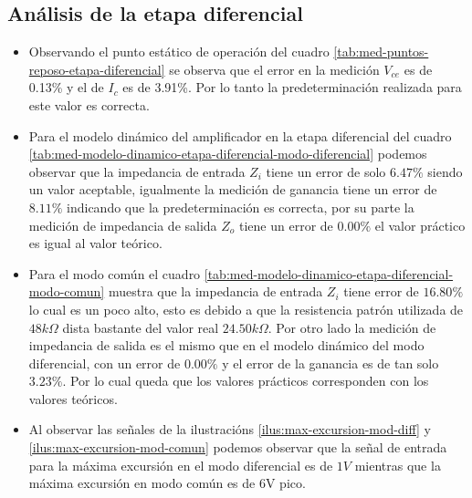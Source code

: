 \subsection{Análisis de la etapa diferencial}


\begin{itemize}
    \item Observando el punto estático de operación del cuadro \ref{tab:med-puntos-reposo-etapa-diferencial} se observa que el error en la medición $V_{ce}$ es de 0.13\% y el de $I_c$ es de 3.91\%. Por lo tanto la predeterminación realizada para este valor es correcta.
    \item Para el modelo dinámico del amplificador en la etapa diferencial del cuadro \ref{tab:med-modelo-dinamico-etapa-diferencial-modo-diferencial} podemos observar que la impedancia de entrada $Z_i$ tiene un error de solo $6.47\%$ siendo un valor aceptable, igualmente la medición de ganancia tiene un error de $8.11\%$ indicando que la predeterminación es correcta, por su parte la medición de impedancia de salida $Z_o$ tiene un error de $0.00\%$ el valor práctico es igual al valor teórico.
    \item Para el modo común el cuadro \ref{tab:med-modelo-dinamico-etapa-diferencial-modo-comun} muestra que la impedancia de entrada $Z_i$ tiene error de $16.80\%$ lo cual es un poco alto, esto es debido a que la resistencia patrón utilizada de $48k\Omega$ dista bastante del valor real $24.50k\Omega$. Por otro lado la medición de impedancia de salida es el mismo que en el modelo dinámico del modo diferencial, con un error de $0.00\%$ y el error de la ganancia es de tan solo $3.23\%$. Por lo cual queda que los valores prácticos corresponden con los valores teóricos.
    \item Al observar las señales de la ilustracións \ref{ilus:max-excursion-mod-diff} y \ref{ilus:max-excursion-mod-comun} podemos observar que la señal de entrada para la máxima excursión en el modo diferencial es de $1V$ mientras que la máxima excursión en modo común es de 6V pico.

\end{itemize}